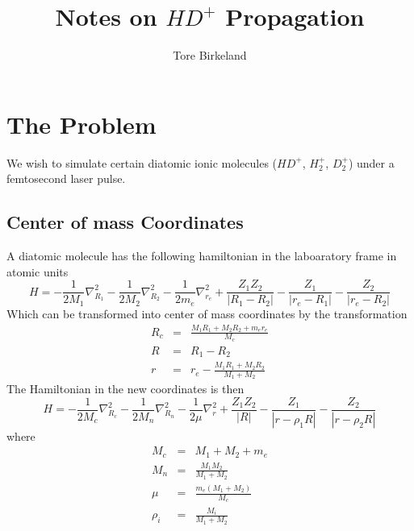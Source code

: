 \documentclass[a4paper]{article}
\title{Notes on $HD^+$ Propagation}
\author{Tore Birkeland}
\begin{document}
\maketitle

\section{The Problem}
We wish to simulate certain diatomic ionic molecules ($HD^+$, $H_2^+$, $D_2^+$) under a femtosecond laser pulse. 

\subsection{Center of mass Coordinates}
A diatomic molecule has the following hamiltonian in the laboaratory frame in atomic units
\begin{equation}
 H = - \frac{1}{2 M_1} \nabla^2_{R_1} - \frac{1}{2 M_2} \nabla^2_{R_2} - \frac{1}{2 m_e} \nabla^2_{r_e} + \frac{Z_1 Z_2}{|R_1 - R_2|} - \frac{Z_1}{|r_e - R_1|} - \frac{Z_2}{|r_e - R_2|}
\end{equation}
Which can be transformed into center of mass coordinates by the transformation
\begin{eqnarray}
	R_c &=& \frac{M_1 R_1  + M_2 R_2 + m_e r_e}{M_c} \\
	R &=& R_1 - R_2 \\
	r &=& r_e - \frac{M_1 R_1 + M_2 R_2}{M_1 + M_2}
\end{eqnarray}
The Hamiltonian in the new coordinates is then
\begin{equation}
\label{eqn:full-hamiltonian-cm}
 H = - \frac{1}{2 M_c} \nabla^2_{R_c} - \frac{1}{2 M_n} \nabla^2_{R_n} - \frac{1}{2 \mu} \nabla^2_{r} + \frac{Z_1 Z_2}{|R|} - \frac{Z_1}{|r - \rho_1 R|} - \frac{Z_2}{|r - \rho_2 R|}
\end{equation}
where
\begin{eqnarray*}
 M_c &=& M_1 + M_2 + m_e \\
 M_n &=& \frac{M_1 M_2}{M_1 + M_2} \\
 \mu &=& \frac{m_e(M_1 + M_2)}{M_c} \\
 \rho_i &=& \frac{M_i}{M_1 + M_2} 
\end{eqnarray*}
\end{document}
